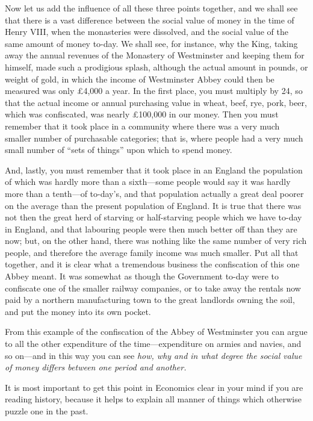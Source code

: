 \documentclass{book}
\begin{document}
Now let us add the influence of all these three points together, and we shall see that there is a vast difference between the social value of money in the time of Henry VIII, when the monasteries were dissolved, and the social value of the same amount of money to-day. We shall see, for instance, why the King, taking away the annual revenues of the Monastery of Westminster and keeping them for himself, made such a prodigious splash, although the actual amount in pounds, or weight of gold, in which the income of Westminster Abbey could then be measured was only £4,000 a year. In the first place, you must multiply by 24, so that the actual income or annual purchasing value in wheat, beef, rye, pork, beer, which was confiscated, was nearly £100,000 in our money. Then you must remember that it took place in a community where there was a very much smaller number of purchasable categories; that is, where people had a very much small number of “sets of things” upon which to spend money.

And, lastly, you must remember that it took place in an England the population of which was hardly more than a sixth—some people would say it was hardly more than a tenth—of to-day’s, and that population actually a great deal poorer on the average than the present population of England. It is true that there was not then the great herd of starving or half-starving people which we have to-day in England, and that labouring people were then much better off than they are now; but, on the other hand, there was nothing like the same number of very rich people, and therefore the average family income was much smaller. Put all that together, and it is clear what a tremendous business the confiscation of this one Abbey meant. It was somewhat as though the Government to-day were to confiscate one of the smaller railway companies, or to take away the rentals now paid by a northern manufacturing town to the great landlords owning the soil, and put the money into its own pocket.

From this example of the confiscation of the Abbey of Westminster you can argue to all the other expenditure of the time—expenditure on armies and navies, and so on—and in this way you can see \emph{how, why and in what degree the social value of money differs between one period and another.}

It is most important to get this point in Economics clear in your mind if you are reading history, because it helps to explain all manner of things which otherwise puzzle one in the past.
\end{document}

